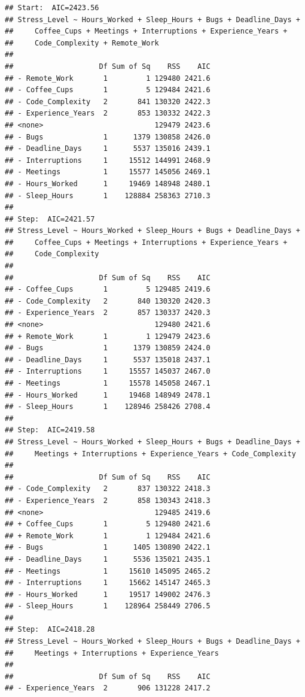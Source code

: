 \documentclass[
]{article}
\begin{document}
\begin{verbatim}
## Start:  AIC=2423.56
## Stress_Level ~ Hours_Worked + Sleep_Hours + Bugs + Deadline_Days + 
##     Coffee_Cups + Meetings + Interruptions + Experience_Years + 
##     Code_Complexity + Remote_Work
## 
##                    Df Sum of Sq    RSS    AIC
## - Remote_Work       1         1 129480 2421.6
## - Coffee_Cups       1         5 129484 2421.6
## - Code_Complexity   2       841 130320 2422.3
## - Experience_Years  2       853 130332 2422.3
## <none>                          129479 2423.6
## - Bugs              1      1379 130858 2426.0
## - Deadline_Days     1      5537 135016 2439.1
## - Interruptions     1     15512 144991 2468.9
## - Meetings          1     15577 145056 2469.1
## - Hours_Worked      1     19469 148948 2480.1
## - Sleep_Hours       1    128884 258363 2710.3
## 
## Step:  AIC=2421.57
## Stress_Level ~ Hours_Worked + Sleep_Hours + Bugs + Deadline_Days + 
##     Coffee_Cups + Meetings + Interruptions + Experience_Years + 
##     Code_Complexity
## 
##                    Df Sum of Sq    RSS    AIC
## - Coffee_Cups       1         5 129485 2419.6
## - Code_Complexity   2       840 130320 2420.3
## - Experience_Years  2       857 130337 2420.3
## <none>                          129480 2421.6
## + Remote_Work       1         1 129479 2423.6
## - Bugs              1      1379 130859 2424.0
## - Deadline_Days     1      5537 135018 2437.1
## - Interruptions     1     15557 145037 2467.0
## - Meetings          1     15578 145058 2467.1
## - Hours_Worked      1     19468 148949 2478.1
## - Sleep_Hours       1    128946 258426 2708.4
## 
## Step:  AIC=2419.58
## Stress_Level ~ Hours_Worked + Sleep_Hours + Bugs + Deadline_Days + 
##     Meetings + Interruptions + Experience_Years + Code_Complexity
## 
##                    Df Sum of Sq    RSS    AIC
## - Code_Complexity   2       837 130322 2418.3
## - Experience_Years  2       858 130343 2418.3
## <none>                          129485 2419.6
## + Coffee_Cups       1         5 129480 2421.6
## + Remote_Work       1         1 129484 2421.6
## - Bugs              1      1405 130890 2422.1
## - Deadline_Days     1      5536 135021 2435.1
## - Meetings          1     15610 145095 2465.2
## - Interruptions     1     15662 145147 2465.3
## - Hours_Worked      1     19517 149002 2476.3
## - Sleep_Hours       1    128964 258449 2706.5
## 
## Step:  AIC=2418.28
## Stress_Level ~ Hours_Worked + Sleep_Hours + Bugs + Deadline_Days + 
##     Meetings + Interruptions + Experience_Years
## 
##                    Df Sum of Sq    RSS    AIC
## - Experience_Years  2       906 131228 2417.2

\end{verbatim}
\end{document}
